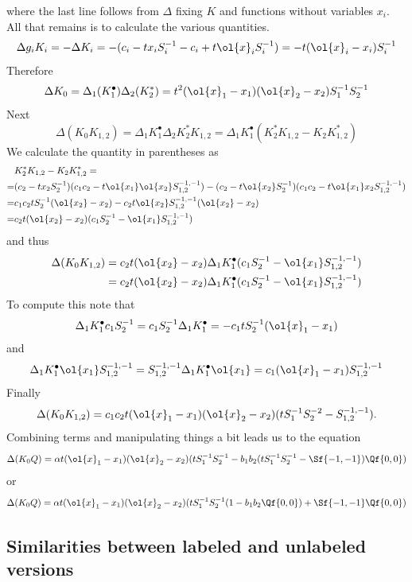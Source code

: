 where the last line follows from $\Delta$ fixing $K$ and functions without variables $x_i$. All that remains is to calculate the various quantities.
\begin{align*}
	\Delta g_iK_i = - \Delta K_i = - (c_i-tx_iS_i^{-1}-c_i + t\ol{x}_i S_i^{-1}) = -t(\ol{x}_i-x_i)S_i^{-1}
\end{align*}
Therefore
\[
	\Delta K_0 = \Delta_1 (K_1^\bullet) \Delta_2 (K_2^\ast) = t^2(\ol{x}_1-x_1)(\ol{x}_2-x_2)S_1^{-1}S_2^{-1}
\]
Next
\[
	\Delta(K_0 K_{1,2}) = \Delta_1 K_1^\bullet \Delta_2 K_2^\ast K_{1,2} = \Delta_1 K_1^\bullet (K_2^\ast K_{1,2}- K_2 K_{1,2}^\ast)
\]
We calculate the quantity in parentheses as
\begin{align*}
	&K_2^\ast K_{1,2}- K_2 K_{1,2}^\ast =\\
	=& (c_2-tx_2S_2^{-1})(c_1c_2-t\ol{x_1}\ol{x_2}S_{1,2}^{-1,-1})-(c_2-t\ol{x_2}S_2^{-1})(c_1c_2-t\ol{x_1}x_2S_{1,2}^{-1,-1})\\
	=&c_1c_2tS_2^{-1}(\ol{x_2}-x_2) - c_2t\ol{x_2}S_{1,2}^{-1,-1}(\ol{x_2}-x_2)\\
	=&c_2t(\ol{x_2}-x_2)(c_1S_2^{-1}-\ol{x_1}S_{1,2}^{-1,-1})
\end{align*}
and thus
\begin{align*}
	\Delta(K_0 K_{1,2})  &= c_2t(\ol{x_2}-x_2) \Delta_1 K_1^\bullet (c_1S_2^{-1}-\ol{x_1}S_{1,2}^{-1,-1})\\
	&=c_2t(\ol{x_2}-x_2) \Delta_1 K_1^\bullet (c_1S_2^{-1}-\ol{x_1}S_{1,2}^{-1,-1})\\
\end{align*}
To compute this note that
\[
\Delta_1 K_1^\bullet c_1 S_2^{-1} = c_1 S_2^{-1}\Delta_1 K_1^\bullet = -c_1t S_2^{-1}(\ol{x}_1-x_1)
\]
and
\[
	\Delta_1 K_1^\bullet \ol{x_1}S_{1,2}^{-1,-1} = S_{1,2}^{-1,-1}\Delta_1 K_1^\bullet \ol{x_1} = c_1 (\ol{x}_1-x_1)S_{1,2}^{-1,-1}
\]
Finally
\[
	\Delta(K_0 K_{1,2}) = c_1c_2t(\ol{x}_1-x_1)(\ol{x}_2-x_2)(t S_1^{-1} S_2^{-2}-S_{1,2}^{-1,-1}).
\]
Combining terms and manipulating things a bit leads us to the equation
\[
	\Delta(K_0 Q) = \alpha t(\ol{x}_1-x_1)(\ol{x}_2-x_2)(tS_1^{-1}S_2^{-1} - b_1b_2(tS_1^{-1}S_2^{-1}-\Sf{-1,-1})\Qf{0,0})
\]
or
\[
	\Delta(K_0 Q) = \alpha t(\ol{x}_1-x_1)(\ol{x}_2-x_2)(tS_1^{-1}S_2^{-1}(1 - b_1b_2\Qf{0,0}) + \Sf{-1,-1}\Qf{0,0})
\]

\subsection{Similarities between labeled and unlabeled versions}


